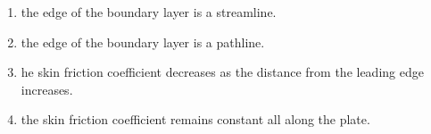 \documentclass[journal]{IEEEtran}
\begin{document}
\begin{enumerate}
\begin{enumerate}
     \item the edge of the boundary layer is a streamline.
    \item the edge of the boundary layer is a pathline.
    \item he skin friction coefficient decreases as the distance from the leading edge increases.
     \item the skin friction coefficient remains constant all along the plate.
\end{enumerate}


\end{enumerate}
\end{document}
